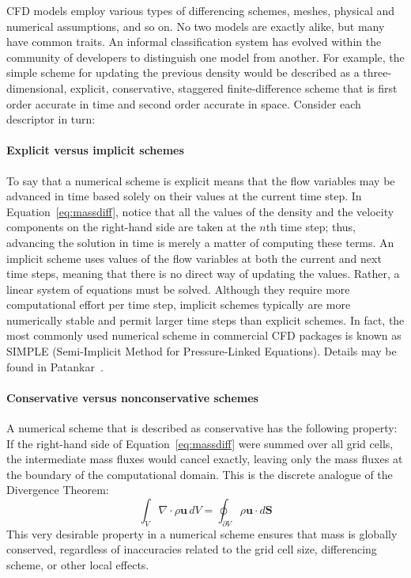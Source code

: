 \documentclass[graybox]{svmult}
\begin{document}
CFD models employ various types of differencing schemes, meshes, physical and numerical assumptions, and so on. No two models are exactly alike, but many have common traits. An informal classification system has evolved within the community of developers to distinguish one model from another. For example, the simple scheme for updating the previous density would be described as a three-dimensional, explicit, conservative, staggered finite-difference scheme that is first order accurate in time and second order accurate in space. Consider each descriptor in turn:

\paragraph{Explicit versus implicit schemes}

To say that a numerical scheme is explicit means that the flow variables may be advanced in time based solely on their values at the current time step. In Equation~\ref{eq:massdiff}, notice that all the values of the density and the velocity components on the right-hand side are taken at the $n$th time step; thus, advancing the solution in time is merely a matter of computing these terms. An implicit scheme uses values of the flow variables at both the current and next time steps, meaning that there is no direct way of updating the values. Rather, a linear system of equations must be solved. Although they require more computational effort per time step, implicit schemes typically are more numerically stable and permit larger time steps than explicit schemes. In fact, the most commonly used numerical scheme in commercial CFD packages is known as SIMPLE (Semi-Implicit Method for Pressure-Linked Equations). Details may be found in Patankar~\cite{Patankar}.

\paragraph{Conservative versus nonconservative schemes}

A numerical scheme that is described as conservative has the following property: If the right-hand side of Equation~\ref{eq:massdiff} were summed over all grid cells, the intermediate mass fluxes would cancel exactly, leaving only the mass fluxes at the boundary of the computational domain. This is the discrete analogue of the Divergence Theorem:
\begin{equation}
\int_V \nabla \cdot \rho \mathbf{u} \, dV = \oint_{\partial V} \rho \mathbf{u} \cdot d\mathbf{S}
\label{eq:divtheorem}
\end{equation}
This very desirable property in a numerical scheme ensures that mass is globally conserved, regardless of inaccuracies related to the grid cell size, differencing scheme, or other local effects.
\end{document}
